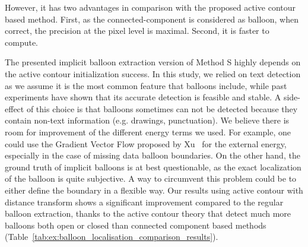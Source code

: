 However, it has two advantages in comparison with the proposed active contour based method.
First, as the connected-component is considered as balloon, when correct, the precision at the pixel level is maximal.
Second, it is faster to compute.

The presented implicit balloon extraction version of Method S highly depends on the active contour initialization success.
In this study, we relied on text detection as we assume it is the most common feature that balloons include, while past experiments have shown that its accurate detection is feasible and stable.
A side-effect of this choice is that balloons sometimes can not be detected because they contain non-text information (e.g. drawings, punctuation).
We believe there is room for improvement of the different energy terms we used.
For example, one could use the Gradient Vector Flow proposed by Xu~\cite{Xu1998} for the external energy, especially in the case of missing data balloon boundaries.
On the other hand, the ground truth of implicit balloons is at best questionable, as the exact localization of the balloon is quite subjective.
A way to circumvent this problem could be to either define the boundary in a flexible way.
Our results using active contour with distance transform shows a significant improvement compared to the regular balloon extraction, thanks to the active contour theory that detect much more balloons both open or closed than connected component based methods (Table~\ref{tab:ex:balloon_localisation_comparison_results}).




